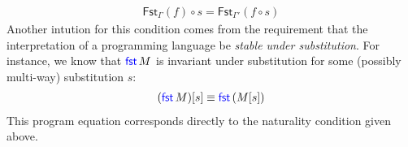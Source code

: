 

\begin{align*}
  \mathsf{Fst}_\Gamma(f) \circ s = \mathsf{Fst}_{\Gamma'}(f \circ s)
\end{align*}
Another intution for this condition comes from the requirement that the interpretation of a programming language
be \emph{stable under substitution}.
For instance, we know that
$\mathsf{{\color{blue}fst}}\,M$ is invariant under substitution for some (possibly multi-way)
substitution $s$:
\begin{align*}
  (\mathsf{{\color{blue}fst}}\,M)[s] \equiv \mathsf{{\color{blue}fst}}\,(M[s])
\end{align*}
This program equation corresponds directly to the naturality condition given above.

